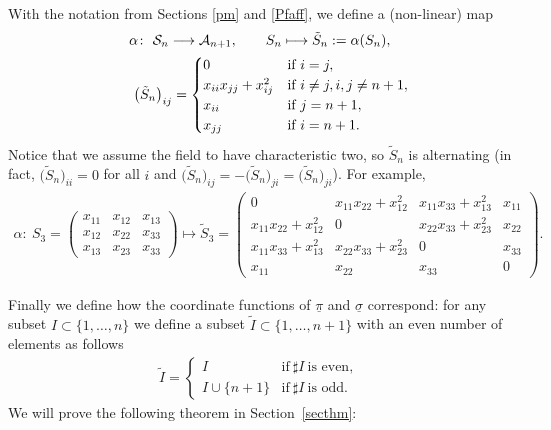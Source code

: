 \documentclass[10pt,a4paper]{amsart}
\newcommand{\cA}{{\cal A}}
\newcommand{\cS}{{\cal S}}
\newcommand{\tI}{{\tilde{I}}}
\newcommand{\tS}{{\tilde{S}}}
\numberwithin{equation}{section}
\providecommand{\cal}{\mathcal}
\begin{document}
With the notation from Sections \ref{pm} and \ref{Pfaff}, we define a (non-linear) map
\begin{gather*}
\alpha\colon \ \cS_n\longrightarrow \cA_{n+1},\qquad
S_n \longmapsto \tS_n:=\alpha(S_n),\\
\hphantom{\alpha\colon}{} \ \big(\tS_n\big)_{ij} =\begin{cases} 0 & \text{if }i=j,\\
 x_{ii}x_{jj}+x_{ij}^2 & \text{if } i \neq j, i,j\neq n+1,\\
 x_{ii} &\text{if }j=n+1,\\
 x_{jj} &\text{if }i=n+1.
 \end{cases}
\end{gather*}
Notice that we assume the field to have characteristic two, so $\tS_n$ is alternating (in fact, $\big(\tS_n\big)_{ii}=0$ for all $i$ and $\big(\tS_n\big)_{ij}=-\big(\tS_n\big)_{ji}=\big(\tS_n\big)_{ji}$).
For example,
\begin{gather*}
\alpha\colon \ S_3 =
\left(\begin{matrix} x_{11}&x_{12}&x_{13}\\
x_{12}&x_{22}&x_{33}\\
x_{13}&x_{23}&x_{33}
\end{matrix}\right)
\longmapsto \tS_3 =
\left(\begin{matrix} 0&x_{11}x_{22}+x_{12}^2&x_{11}x_{33}+x_{13}^2&x_{11}\\
x_{11}x_{22}+x_{12}^2&0& x_{22}x_{33}+x_{23}^2& x_{22}\\
x_{11}x_{33}+x_{13}^2& x_{22}x_{33}+x_{23}^2 &0&x_{33}\\
x_{11}&x_{22}&x_{33}&0
\end{matrix}\right).
\end{gather*}

Finally we define how the coordinate functions of $\underline{\pi}$ and $\underline{\sigma}$ correspond: for any subset $I\subset\{1,\ldots,n\}$ we define a subset $\tI\subset\{1,\ldots,n+1\}$ with an even number of elements as follows
\begin{gather*}
\tI = \begin{cases}
 I&\text{if} \ \sharp I \ \text{is even},\\
 I\cup\{n+1\}&\text{if} \ \sharp I \ \text{is odd}.
 \end{cases}
\end{gather*}
We will prove the following theorem in Section~\ref{secthm}:
\end{document}
